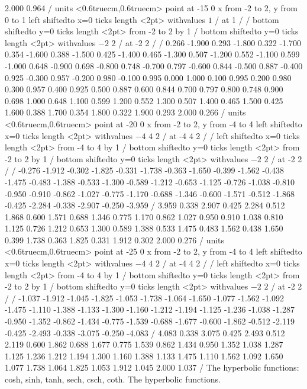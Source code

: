 {2.000 0.964 /
\setcoordinatesystem units <0.6truecm,0.6truecm> point at -15 0
\setplotarea x from -2 to 2, y from 0 to 1
\axis left shiftedto x=0 ticks length <2pt> withvalues {$1$} / at 1 / /
\axis bottom shiftedto y=0 ticks length <2pt> from -2 to 2 by 1 /
\axis bottom shiftedto y=0 ticks length <2pt> withvalues {$-2$} {$2$} / at -2 2 / /
 0.266 -1.900 0.293 -1.800 0.322 -1.700 0.354 -1.600 0.388 
-1.500 0.425 -1.400 0.465 -1.300 0.507 -1.200 0.552 -1.100 0.599 
-1.000 0.648 -0.900 0.698 -0.800 0.748 -0.700 0.797 -0.600 0.844 
-0.500 0.887 -0.400 0.925 -0.300 0.957 -0.200 0.980 -0.100 0.995 
0.000 1.000 0.100 0.995 0.200 0.980 0.300 0.957 0.400 0.925 
0.500 0.887 0.600 0.844 0.700 0.797 0.800 0.748 0.900 0.698 
1.000 0.648 1.100 0.599 1.200 0.552 1.300 0.507 1.400 0.465 
1.500 0.425 1.600 0.388 1.700 0.354 1.800 0.322 1.900 0.293 
2.000 0.266 /
\setcoordinatesystem units <0.6truecm,0.6truecm> point at -20 0
\setplotarea x from -2 to 2, y from -4 to 4
\axis left shiftedto x=0 ticks length <2pt> withvalues {$-4$}
{$4$} {$2$} / at -4 4 2 / /
\axis left shiftedto x=0 ticks length <2pt> from -4 to 4 by 1 /
\axis bottom shiftedto y=0 ticks length <2pt> from -2 to 2 by 1 /
\axis bottom shiftedto y=0 ticks length <2pt> withvalues {$-2$} {$2$} / at -2 2 / /
 -0.276 -1.912 -0.302 -1.825 -0.331 -1.738 -0.363 -1.650 -0.399 
-1.562 -0.438 -1.475 -0.483 -1.388 -0.533 -1.300 -0.589 -1.212 -0.653 
-1.125 -0.726 -1.038 -0.810 -0.950 -0.910 -0.862 -1.027 -0.775 -1.170 
-0.688 -1.346 -0.600 -1.571 -0.512 -1.868 -0.425 -2.284 -0.338 -2.907 
-0.250 -3.959 /
 3.959 0.338 2.907 0.425 2.284 0.512 1.868 0.600 1.571 
0.688 1.346 0.775 1.170 0.862 1.027 0.950 0.910 1.038 0.810 
1.125 0.726 1.212 0.653 1.300 0.589 1.388 0.533 1.475 0.483 
1.562 0.438 1.650 0.399 1.738 0.363 1.825 0.331 1.912 0.302 
2.000 0.276 /
\setcoordinatesystem units <0.6truecm,0.6truecm> point at -25 0
\setplotarea x from -2 to 2, y from -4 to 4
\axis left shiftedto x=0 ticks length <2pt> withvalues {$-4$}
{$4$} {$2$} / at -4 4 2 / /
\axis left shiftedto x=0 ticks length <2pt> from -4 to 4 by 1 /
\axis bottom shiftedto y=0 ticks length <2pt> from -2 to 2 by 1 /
\axis bottom shiftedto y=0 ticks length <2pt> withvalues {$-2$} {$2$} / at -2 2 / /
 -1.037 -1.912 -1.045 -1.825 -1.053 -1.738 -1.064 -1.650 -1.077 
-1.562 -1.092 -1.475 -1.110 -1.388 -1.133 -1.300 -1.160 -1.212 -1.194 
-1.125 -1.236 -1.038 -1.287 -0.950 -1.352 -0.862 -1.434 -0.775 -1.539 
-0.688 -1.677 -0.600 -1.862 -0.512 -2.119 -0.425 -2.493 -0.338 -3.075 
-0.250 -4.083 /
 4.083 0.338 3.075 0.425 2.493 0.512 2.119 0.600 1.862 
0.688 1.677 0.775 1.539 0.862 1.434 0.950 1.352 1.038 1.287 
1.125 1.236 1.212 1.194 1.300 1.160 1.388 1.133 1.475 1.110 
1.562 1.092 1.650 1.077 1.738 1.064 1.825 1.053 1.912 1.045 
2.000 1.037 /
\endpicture}
\begincaption
The hyperbolic functions: cosh, sinh, tanh, sech, csch, coth.
\endcaption
\endtexonly
{}
\htmlonly
\begincaption
The hyperbolic functions.
\endcaption
\endhtmlonly
\endfigure

